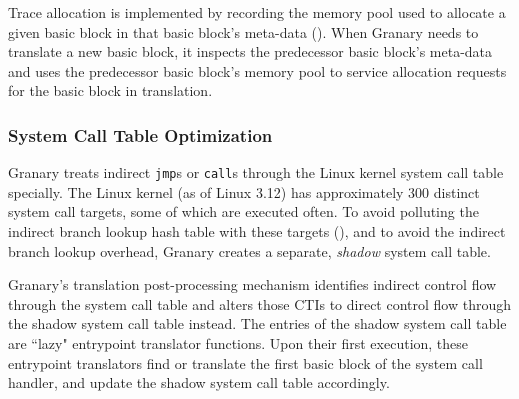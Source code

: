 \documentclass[preprint]{sigplanconf}
\begin{document}
Trace allocation is implemented by recording the memory pool used to allocate a given basic block in that basic block's meta-data (). When Granary needs to translate a new basic block, it inspects the predecessor basic block's meta-data and uses the predecessor basic block's memory pool to service allocation requests for the basic block in translation.

\subsubsection{System Call Table Optimization}

Granary treats indirect \texttt{jmp}s or \texttt{call}s through the Linux kernel system call table specially. The Linux kernel (as of Linux 3.12) has approximately 300 distinct system call targets, some of which are executed often. To avoid polluting the indirect branch lookup hash table with these targets (), and to avoid the indirect branch lookup overhead, Granary creates a separate, \emph{shadow} system call table.

Granary's translation post-processing mechanism identifies indirect control flow through the system call table and alters those CTIs to direct control flow through the shadow system call table instead. The entries of the shadow system call table are ``lazy" entrypoint translator functions. Upon their first execution, these entrypoint translators find or translate the first basic block of the system call handler, and update the shadow system call table accordingly. 
\end{document}
